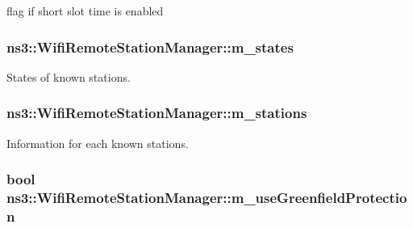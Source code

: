 flag if short slot time is enabled 

\subsubsection[{\texorpdfstring{m\+\_\+states}{m_states}}]{ ns3\+::\+Wifi\+Remote\+Station\+Manager\+::m\+\_\+states\hspace{0.3cm}{\ttfamily [private]}}\hypertarget{classns3_1_1WifiRemoteStationManager_aa1b308110d49a43fcad379978fd90cc5}{}\label{classns3_1_1WifiRemoteStationManager_aa1b308110d49a43fcad379978fd90cc5}


States of known stations. 

\subsubsection[{\texorpdfstring{m\+\_\+stations}{m_stations}}]{ ns3\+::\+Wifi\+Remote\+Station\+Manager\+::m\+\_\+stations\hspace{0.3cm}{\ttfamily [private]}}\hypertarget{classns3_1_1WifiRemoteStationManager_abe6711bcc48ef1c5a3f4c9949137080d}{}\label{classns3_1_1WifiRemoteStationManager_abe6711bcc48ef1c5a3f4c9949137080d}


Information for each known stations. 

\subsubsection[{\texorpdfstring{m\+\_\+use\+Greenfield\+Protection}{m_useGreenfieldProtection}}]{\setlength{\rightskip}{0pt plus 5cm}bool ns3\+::\+Wifi\+Remote\+Station\+Manager\+::m\+\_\+use\+Greenfield\+Protection\hspace{0.3cm}{\ttfamily [private]}}\hypertarget{classns3_1_1WifiRemoteStationManager_ad6adddbb6f117ffda3624f49e358b9d6}{}\label{classns3_1_1WifiRemoteStationManager_ad6adddbb6f117ffda3624f49e358b9d6}


